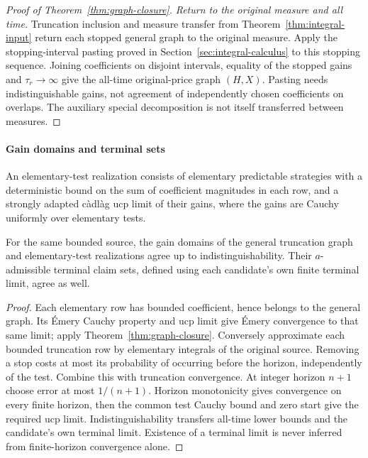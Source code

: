 \begin{proof}[Proof of Theorem~\ref{thm:graph-closure}]
\emph{Return to the original measure and all time.}
Truncation inclusion and measure transfer from
Theorem~\ref{thm:integral-input} return each stopped general graph to the
original measure. Apply the stopping-interval pasting proved in
Section~\ref{sec:integral-calculus} to this stopping sequence.
Joining coefficients on disjoint intervals, equality of the stopped gains
and $\tau_r\to\infty$ give the all-time original-price graph $(H,X)$.
Pasting needs indistinguishable gains, not agreement of independently chosen
coefficients on overlaps. The auxiliary special decomposition is not itself
transferred between measures.
\end{proof}

\paragraph{Gain domains and terminal sets}
An elementary-test realization consists of elementary predictable strategies
with a deterministic bound on the sum of coefficient magnitudes in each row,
and a strongly adapted c\`adl\`ag ucp limit of their gains, where the gains
are Cauchy uniformly over elementary tests.
\begin{proposition}
For the same bounded source, the gain domains of the general truncation graph
and elementary-test realizations agree up to indistinguishability.
Their $a$-admissible terminal claim sets, defined using each candidate's own
finite terminal limit, agree as well.
\end{proposition}
\begin{proof}
Each elementary row has bounded coefficient, hence belongs to the general
graph. Its Émery Cauchy property and ucp limit give Émery convergence to that
same limit; apply Theorem~\ref{thm:graph-closure}.
Conversely approximate each bounded truncation row by elementary integrals
of the original source. Removing a stop costs at most its probability of
occurring before the horizon, independently of the test. Combine this with
truncation convergence. At integer horizon $n+1$ choose error at most
$1/(n+1)$. Horizon monotonicity gives convergence on every finite horizon,
then the common test Cauchy bound and zero start give the required ucp limit.
Indistinguishability transfers all-time lower bounds and the candidate's own
terminal limit. Existence of a terminal limit is never inferred from
finite-horizon convergence alone.
\end{proof}
